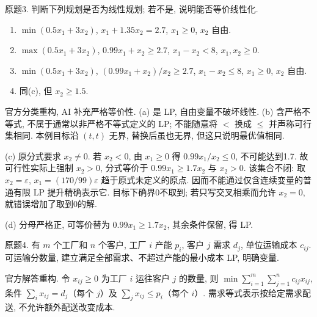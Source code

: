 \begin{exercise}\label{ass:15053-rec1-q3}
原题3. 判断下列规划是否为线性规划; 若不是, 说明能否等价线性化.
\begin{enumerate}[label=(\alph*)]
\item $\min(0.5x_1+3x_2)$, $x_1+1.35x_2=2.7$, $x_1\ge0$, $x_2$ 自由.
\item $\max(0.5x_1+3x_2)$, $0.99x_1+x_2\ge2.7$, $x_1-x_2<8$, $x_1,x_2\ge0$.
\item $\min(0.5x_1+3x_2)$, $(0.99x_1+x_2)/x_2\ge2.7$, $x_1-x_2\le8$, $x_1\ge0$, $x_2$ 自由.
\item 同(c), 但 $x_2\ge1.5$.
\end{enumerate}
\end{exercise}
\begin{solution}
官方分类重构, AI 补充严格等价性. (a) 是 LP, 自由变量不破坏线性. (b) 含严格不等式, 不属于通常以非严格不等式定义的 LP; 不能随意将 $<$ 换成 $\le$ 并声称可行集相同. 本例目标沿 $(t,t)$ 无界, 替换后虽也无界, 但这只说明最优值相同.

(c) 原分式要求 $x_2\ne0$. 若 $x_2<0$, 由 $x_1\ge0$ 得 $0.99x_1/x_2\le0$, 不可能达到1.7. 故可行性实际上强制 $x_2>0$, 分式等价于 $0.99x_1\ge1.7x_2$ 与 $x_2>0$. 该集合不闭: 取 $x_2=\varepsilon$, $x_1=(170/99)\varepsilon$ 趋于原式未定义的原点. 因而不能通过仅含连续变量的普通有限 LP 提升精确表示它. 目标下确界0不取到; 若只写交叉相乘而允许 $x_2=0$, 就错误增加了取到0的解.

(d) 分母严格正, 可等价替为 $0.99x_1\ge1.7x_2$, 其余条件保留, 得 LP.
\end{solution}

\begin{exercise}\label{ass:15053-rec1-q4}
原题4. 有 $m$ 个工厂和 $n$ 个客户, 工厂 $i$ 产能 $p_i$, 客户 $j$ 需求 $d_j$, 单位运输成本 $c_{ij}$. 可运输分数量, 建立满足全部需求、不超过产能的最小成本 LP, 明确变量.
\end{exercise}
\begin{solution}
官方解答重构. 令 $x_{ij}\ge0$ 为工厂 $i$ 运往客户 $j$ 的数量, 则
$\min\sum_{i=1}^m\sum_{j=1}^n c_{ij}x_{ij}$, 条件 $\sum_i x_{ij}=d_j$（每个 $j$）及 $\sum_jx_{ij}\le p_i$（每个 $i$）. 需求等式表示按给定需求配送, 不允许额外配送改变成本.
\end{solution}

